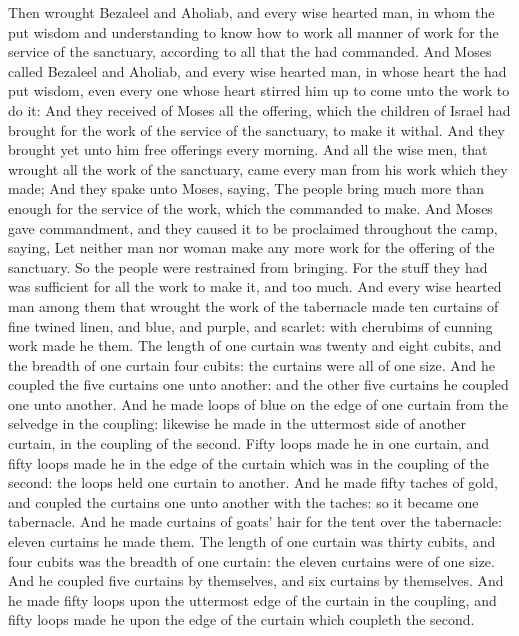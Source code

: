 \begin{biblechapter} %
\verse Then wrought Bezaleel and Aholiab, and every wise hearted man, in whom the \LORD put wisdom and understanding to know how to work all manner of work for the service of the sanctuary, according to all that the \LORD had commanded.
\verse And Moses called Bezaleel and Aholiab, and every wise hearted man, in whose heart the \LORD had put wisdom, even every one whose heart stirred him up to come unto the work to do it:
\verse And they received of Moses all the offering, which the children of Israel had brought for the work of the service of the sanctuary, to make it withal. And they brought yet unto him free offerings every morning.
\verse And all the wise men, that wrought all the work of the sanctuary, came every man from his work which they made;
\verse And they spake unto Moses, saying, The people bring much more than enough for the service of the work, which the \LORD commanded to make.
\verse And Moses gave commandment, and they caused it to be proclaimed throughout the camp, saying, Let neither man nor woman make any more work for the offering of the sanctuary. So the people were restrained from bringing.
\verse For the stuff they had was sufficient for all the work to make it, and too much.
 And every wise hearted man among them that wrought the work of the tabernacle made ten curtains of fine twined linen, and blue, and purple, and scarlet: with cherubims of cunning work made he them.
\verse The length of one curtain was twenty and eight cubits, and the breadth of one curtain four cubits: the curtains were all of one size.
\verse And he coupled the five curtains one unto another: and the other five curtains he coupled one unto another.
\verse And he made loops of blue on the edge of one curtain from the selvedge in the coupling: likewise he made in the uttermost side of another curtain, in the coupling of the second.
\verse Fifty loops made he in one curtain, and fifty loops made he in the edge of the curtain which was in the coupling of the second: the loops held one curtain to another.
\verse And he made fifty taches of gold, and coupled the curtains one unto another with the taches: so it became one tabernacle.
\verse And he made curtains of goats' hair for the tent over the tabernacle: eleven curtains he made them.
\verse The length of one curtain was thirty cubits, and four cubits was the breadth of one curtain: the eleven curtains were of one size.
\verse And he coupled five curtains by themselves, and six curtains by themselves.
\verse And he made fifty loops upon the uttermost edge of the curtain in the coupling, and fifty loops made he upon the edge of the curtain which coupleth the second.

\end{biblechapter}
